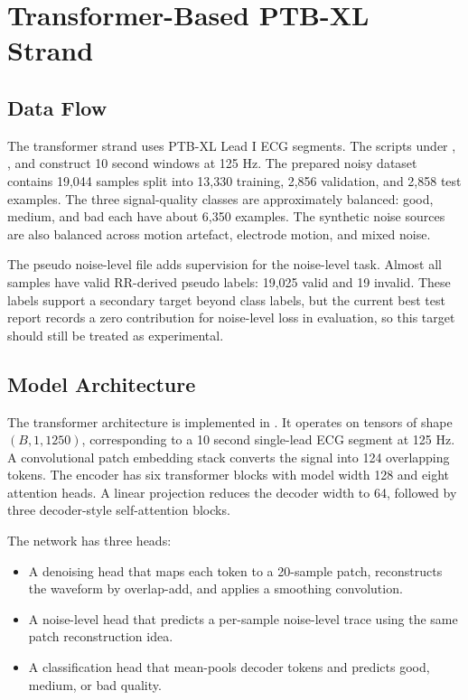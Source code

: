 \documentclass[11pt,a4paper]{article}
\begin{document}
\section{Transformer-Based PTB-XL Strand}

\subsection{Data Flow}

The transformer strand uses PTB-XL Lead I ECG segments. The scripts under , , and  construct 10 second windows at 125 Hz. The prepared noisy dataset contains 19,044 samples split into 13,330 training, 2,856 validation, and 2,858 test examples. The three signal-quality classes are approximately balanced: good, medium, and bad each have about 6,350 examples. The synthetic noise sources are also balanced across motion artefact, electrode motion, and mixed noise.

The pseudo noise-level file  adds supervision for the noise-level task. Almost all samples have valid RR-derived pseudo labels: 19,025 valid and 19 invalid. These labels support a secondary target beyond class labels, but the current best test report records a zero contribution for noise-level loss in evaluation, so this target should still be treated as experimental.

\subsection{Model Architecture}

The transformer architecture is implemented in . It operates on tensors of shape $(B,1,1250)$, corresponding to a 10 second single-lead ECG segment at 125 Hz. A convolutional patch embedding stack converts the signal into 124 overlapping tokens. The encoder has six transformer blocks with model width 128 and eight attention heads. A linear projection reduces the decoder width to 64, followed by three decoder-style self-attention blocks.

The network has three heads:
\begin{itemize}
  \item A denoising head that maps each token to a 20-sample patch, reconstructs the waveform by overlap-add, and applies a smoothing convolution.
  \item A noise-level head that predicts a per-sample noise-level trace using the same patch reconstruction idea.
  \item A classification head that mean-pools decoder tokens and predicts good, medium, or bad quality.
\end{itemize}
\end{document}
